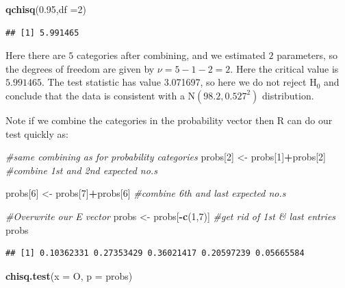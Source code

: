 \documentclass[
]{book}
\newenvironment{Shaded}{\begin{snugshade}}{\end{snugshade}}
\newcommand{\CommentTok}[1]{\textcolor[rgb]{0.56,0.35,0.01}{\textit{#1}}}
\newcommand{\DataTypeTok}[1]{\textcolor[rgb]{0.13,0.29,0.53}{#1}}
\newcommand{\DecValTok}[1]{\textcolor[rgb]{0.00,0.00,0.81}{#1}}
\newcommand{\FloatTok}[1]{\textcolor[rgb]{0.00,0.00,0.81}{#1}}
\newcommand{\KeywordTok}[1]{\textcolor[rgb]{0.13,0.29,0.53}{\textbf{#1}}}
\newcommand{\NormalTok}[1]{#1}
\newcommand{\OperatorTok}[1]{\textcolor[rgb]{0.81,0.36,0.00}{\textbf{#1}}}
\newcommand{\StringTok}[1]{\textcolor[rgb]{0.31,0.60,0.02}{#1}}
\theoremstyle{definition}
\theoremstyle{definition}
\theoremstyle{definition}
\theoremstyle{definition}
\theoremstyle{remark}
\begin{document}
\begin{Shaded}
\begin{Highlighting}[]
\KeywordTok{qchisq}\NormalTok{(}\FloatTok{0.95}\NormalTok{,}\DataTypeTok{df =}\DecValTok{2}\NormalTok{)}
\end{Highlighting}
\end{Shaded}

\begin{verbatim}
## [1] 5.991465
\end{verbatim}

Here there are \(5\) categories after combining, and we estimated \(2\) parameters, so the degrees of freedom are given by \(\nu = 5-1-2=2\).
Here the critical value is \(5.991465\). The test statistic has value 3.071697, so here we do not reject \(\text{H}_0\) and conclude that the data is consistent with a \(\text{N}(98.2,0.527^2)\) distribution.

Note if we combine the categories in the probability vector then R can do our test quickly as:

\begin{Shaded}
\begin{Highlighting}[]
\CommentTok{#same combining as for probability categories}
\NormalTok{probs[}\DecValTok{2}\NormalTok{] <-}\StringTok{ }\NormalTok{probs[}\DecValTok{1}\NormalTok{]}\OperatorTok{+}\NormalTok{probs[}\DecValTok{2}\NormalTok{] }\CommentTok{#combine 1st and 2nd expected no.s}

\NormalTok{probs[}\DecValTok{6}\NormalTok{] <-}\StringTok{ }\NormalTok{probs[}\DecValTok{7}\NormalTok{]}\OperatorTok{+}\NormalTok{probs[}\DecValTok{6}\NormalTok{] }\CommentTok{#combine 6th and last expected no.s}

\CommentTok{#Overwrite our E vector}
\NormalTok{probs <-}\StringTok{ }\NormalTok{probs[}\OperatorTok{-}\KeywordTok{c}\NormalTok{(}\DecValTok{1}\NormalTok{,}\DecValTok{7}\NormalTok{)] }\CommentTok{#get rid of 1st & last entries}
\NormalTok{probs}
\end{Highlighting}
\end{Shaded}

\begin{verbatim}
## [1] 0.10362331 0.27353429 0.36021417 0.20597239 0.05665584
\end{verbatim}

\begin{Shaded}
\begin{Highlighting}[]
\KeywordTok{chisq.test}\NormalTok{(}\DataTypeTok{x =}\NormalTok{ O, }\DataTypeTok{p =}\NormalTok{ probs)}
\end{Highlighting}
\end{Shaded}
\end{document}
